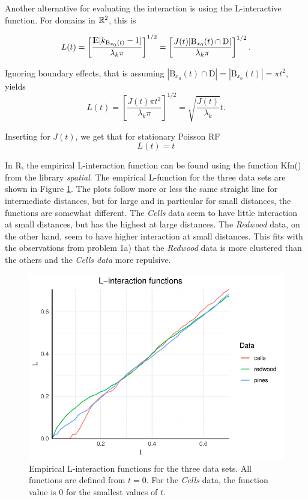 Another alternative for evaluating the interaction is using the L-interactive function. For domains in $\mathbb{R}^2$, this is

\begin{equation}
    L(t) = \left[\frac{{\rm I\kern-.3em E}{[k_{\textrm{B}_{x_0}(t)}-1]}}{\lambda_k \pi}\right]^{1/2} = \left[\frac{J(t)|\textrm{B}_{x_0}(t) \cap \textrm{D}|}{\lambda_k \pi}\right]^{1/2}.
\end{equation}

Ignoring boundary effects, that is assuming $|\textrm{B}_{x_0}(t) \cap \textrm{D}| = |\textrm{B}_{x_0}(t)| = \pi t^2$, yields
\begin{equation}
    L(t) = \left[\frac{J(t)\pi t^2}{\lambda_k \pi}\right]^{1/2} = \sqrt{\frac{J(t)}{\lambda_k}}t .
    \label{eq:L_function}
\end{equation}

Inserting for $J(t)$, we get that for stationary Poisson RF
\begin{equation}
    L(t) = t
\end{equation}

In R, the empirical L-interaction function can be found using the function Kfn() from the library \textit{spatial}. The empirical L-function for the three data sets are shown in Figure \ref{fig:L_emp}. The plots follow more or less the same straight line for intermediate distances, but for large and in particular for small distances, the functions are somewhat different. The \textit{Cells} data seem to have little interaction at small distances, but has the highest at large distances. The \textit{Redwood} data, on the other hand, seem to have higher interaction at small distances. This fits with the observations from problem 1a) that the \textit{Redwood} data is more clustered than the others and the \textit{Cells data} more repulsive. 

\begin{figure}
    \centering
    \includegraphics[scale=0.95]{figures/prob1_L_empirical.pdf}
    \caption{Empirical L-interaction functions for the three data sets. All functions are defined from $t = 0$. For the \textit{Cells} data, the function value is $0$ for the smallest values of $t$.}
    \label{fig:L_emp}
\end{figure}

